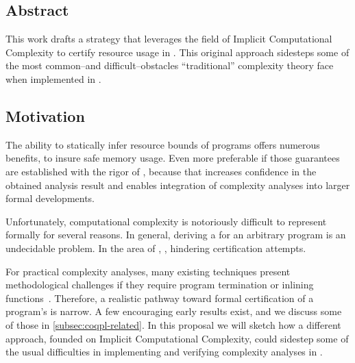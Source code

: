 \subsection*{Abstract}

This work drafts a strategy that leverages the field of Implicit Computational
Complexity to certify resource usage in . This original
approach sidesteps some of the most common--and difficult--obstacles
\enquote{traditional} complexity theory face when implemented in .

\subsection{Motivation}
\label{subsec:coqpl-motivation}

The ability to statically infer resource bounds of programs offers numerous
benefits, \eg to insure safe memory usage. Even more
preferable if those guarantees are established with the rigor of , because that increases confidence in the obtained analysis result
and enables integration of complexity analyses into
larger formal developments.

Unfortunately, computational complexity is notoriously difficult to represent
formally for several reasons. In general, deriving a  for
an arbitrary program is an undecidable problem. In the
area of , , hindering
certification attempts.

For practical complexity analyses, many existing
techniques present methodological challenges if they require \eg program
termination or inlining functions~\cite{carbonneaux2015}. Therefore, a realistic
pathway toward formal certification of a program's  is
narrow. A few encouraging early results exist, and we discuss some of those in
\autoref{subsec:coqpl-related}. In this proposal we will sketch how a different
approach, founded on Implicit Computational Complexity, could sidestep some of
the usual difficulties in implementing and verifying complexity analyses in
.

